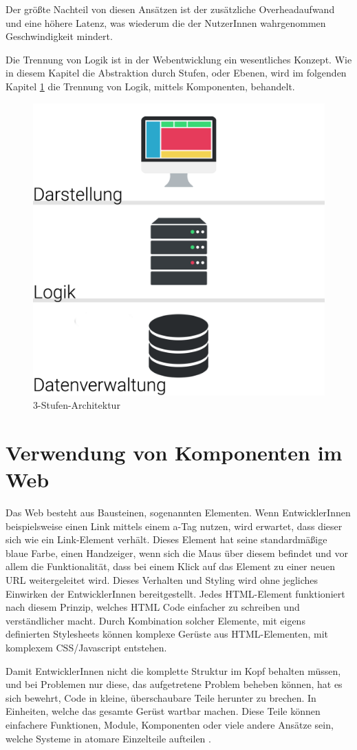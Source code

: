 Der größte Nachteil von diesen Ansätzen ist der zusätzliche Overheadaufwand und eine höhere Latenz, was wiederum die der NutzerInnen wahrgenommen Geschwindigkeit mindert.

Die Trennung von Logik ist in der Webentwicklung ein wesentliches Konzept. Wie in diesem Kapitel die Abstraktion durch Stufen, oder Ebenen, wird im folgenden Kapitel \ref{cha:component_usage} die Trennung von Logik, mittels Komponenten, behandelt.

\begin{figure}
	\centering
	\includegraphics[width=0.5\linewidth]{images/3-stufen-architektur}
	\caption{3-Stufen-Architektur}
	\label{fig:3-stufen-architektur}
\end{figure}

\section{Verwendung von Komponenten im Web}
\label{cha:component_usage}

Das Web besteht aus Bausteinen, sogenannten Elementen. Wenn EntwicklerInnen beispielsweise einen Link mittels einem a-Tag nutzen, wird erwartet, dass dieser sich wie ein Link-Element verhält. Dieses Element hat seine standardmäßige blaue Farbe, einen Handzeiger, wenn sich die Maus über diesem befindet und vor allem die Funktionalität, dass bei einem Klick auf das Element zu einer neuen URL weitergeleitet wird. Dieses Verhalten und Styling wird ohne jegliches Einwirken der EntwicklerInnen bereitgestellt. Jedes HTML-Element funktioniert nach diesem Prinzip, welches HTML Code einfacher zu schreiben und verständlicher macht.
Durch Kombination solcher Elemente, mit eigens definierten Stylesheets können komplexe Gerüste aus HTML-Elementen, mit komplexem CSS/Javascript entstehen.

Damit EntwicklerInnen nicht die komplette Struktur im Kopf behalten müssen, und bei Problemen nur diese, das aufgetretene Problem beheben können, hat es sich bewehrt, Code in kleine, überschaubare Teile herunter zu brechen. In Einheiten, welche das gesamte Gerüst wartbar machen. Diese Teile können einfachere Funktionen, Module, Komponenten oder viele andere Ansätze sein, welche Systeme in atomare Einzelteile aufteilen \cite{components-benefit}.

